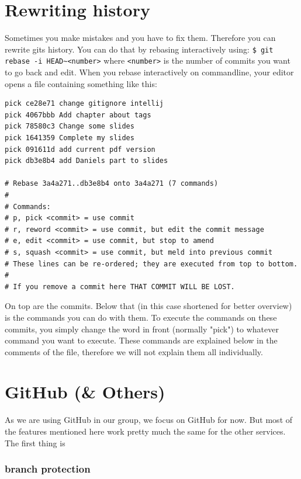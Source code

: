 \documentclass[a4paper, 12pt]{article}
\begin{document}
	\section {Rewriting history}
	
	Sometimes you make mistakes and you have to fix them. Therefore you can rewrite gits history. You can do that by rebasing interactively using:\newline
	\lstinline|$ git rebase -i HEAD~<number>|\newline
	where \lstinline|<number>| is the number of commits you want to go back and edit. When you rebase interactively on commandline, your editor opens a file containing something like this:
		\newpage
		\begin{lstlisting}[basicstyle=\tiny]
pick ce28e71 change gitignore intellij
pick 4067bbb Add chapter about tags
pick 78580c3 Change some slides
pick 1641359 Complete my slides
pick 091611d add current pdf version
pick db3e8b4 add Daniels part to slides

# Rebase 3a4a271..db3e8b4 onto 3a4a271 (7 commands)
#
# Commands:
# p, pick <commit> = use commit
# r, reword <commit> = use commit, but edit the commit message
# e, edit <commit> = use commit, but stop to amend
# s, squash <commit> = use commit, but meld into previous commit
# These lines can be re-ordered; they are executed from top to bottom.                                                           
#
# If you remove a commit here THAT COMMIT WILL BE LOST.
		\end{lstlisting}
		
		On top are the commits. Below that (in this case shortened for better overview) is the commands you can do with them. To execute the commands on these commits, you simply change the word in front (normally "pick") to whatever command you want to execute. These commands are explained below in the comments of the file, therefore we will not explain them all individually.
	\section{GitHub (\& Others)}
		
		As we are using GitHub in our group, we focus on GitHub for now. But most of the features mentioned here work pretty much the same for the other services. The first thing is 
		
		\subsubsection{branch protection}
		
\end{document}
